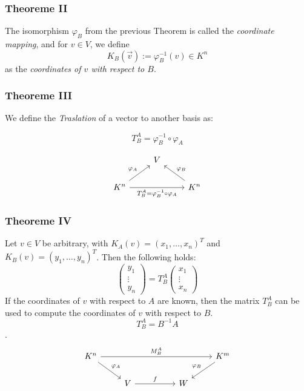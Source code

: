 \subsubsection*{Theoreme II} 

The isomorphism \( \varphi_B \) from the previous 
Theorem is called the \emph{coordinate mapping},  
and for \( v \in V \), we define
\[
K_B (\vec{v}) := \varphi_B^{-1} (v) \in K^n
\]
as the \emph{coordinates of \( v \) with respect to \( B \)}.

\subsubsection*{Theoreme III} We define the \emph{Traslation} of a vector to another
basis as:

\[
T_{B}^{A} = \varphi_{B}^{-1} \circ \varphi_A
\]

\[
\begin{tikzcd}
& V & \\
K^n \arrow[ur, "\varphi_A"] \arrow[rr, "T_{B}^{A} = \varphi_B^{-1} \circ \varphi_A"'] & & K^n \arrow[ul, "\varphi_B"']
\end{tikzcd}
\]

\subsubsection*{Theoreme IV} 

Let \( v \in V \) be arbitrary, 
with \( K_A(v) = (x_1, \ldots, x_n)^T \) 
and \( K_B(v) = (y_1, \ldots, y_n)^T \).  
Then the following holds:
\[
\begin{pmatrix}
y_1 \\
\vdots \\
y_n
\end{pmatrix}
=
T_B^A
\begin{pmatrix}
x_1 \\
\vdots \\
x_n
\end{pmatrix}
\]
If the coordinates of \( v \) with respect to \( A \) are known, then the matrix \( T_B^A \) can be used to compute the coordinates of \( v \) with respect to \( B \).
\[ T_B^A = B^{-1}A \].
\[
    \begin{tikzcd}
        K^n \arrow[rrrr, "M_{B}^{A}"] \arrow[rd, "\varphi_A"] &                   &  &   & K^m \arrow[ld, "\varphi_B"'] \\
                                                              & V \arrow[rr, "f"] &  & W &                             
        \end{tikzcd}
\]

